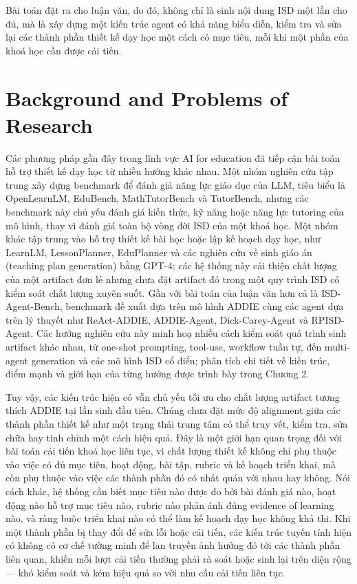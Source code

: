 \documentclass[../main.tex]{subfiles}
\begin{document}
Bài toán đặt ra cho luận văn, do đó, không chỉ là sinh nội dung ISD một lần cho đủ, mà là xây dựng một kiến trúc agent có khả năng biểu diễn, kiểm tra và sửa lại các thành phần thiết kế dạy học một cách có mục tiêu, mỗi khi một phần của khoá học cần được cải tiến.

\section{Background and Problems of Research}
\label{sec:giaiphap}

Các phương pháp gần đây trong lĩnh vực AI for education đã tiếp cận bài toán hỗ trợ thiết kế dạy học từ nhiều hướng khác nhau. Một nhóm nghiên cứu tập trung xây dựng benchmark để đánh giá năng lực giáo dục của LLM, tiêu biểu là OpenLearnLM, EduBench, MathTutorBench và TutorBench, nhưng các benchmark này chủ yếu đánh giá kiến thức, kỹ năng hoặc năng lực tutoring của mô hình, thay vì đánh giá toàn bộ vòng đời ISD của một khoá học. Một nhóm khác tập trung vào hỗ trợ thiết kế bài học hoặc lập kế hoạch dạy học, như LearnLM, LessonPlanner, EduPlanner và các nghiên cứu về sinh giáo án (teaching plan generation) bằng GPT-4; các hệ thống này cải thiện chất lượng của một artifact đơn lẻ nhưng chưa đặt artifact đó trong một quy trình ISD có kiểm soát chất lượng xuyên suốt. Gần với bài toán của luận văn hơn cả là ISD-Agent-Bench, benchmark đề xuất dựa trên mô hình ADDIE cùng các agent dựa trên lý thuyết như ReAct-ADDIE, ADDIE-Agent, Dick-Carey-Agent và RPISD-Agent. Các hướng nghiên cứu này minh hoạ nhiều cách kiểm soát quá trình sinh artifact khác nhau, từ one-shot prompting, tool-use, workflow tuần tự, đến multi-agent generation và các mô hình ISD cổ điển; phân tích chi tiết về kiến trúc, điểm mạnh và giới hạn của từng hướng được trình bày trong Chương 2.

Tuy vậy, các kiến trúc hiện có vẫn chủ yếu tối ưu cho chất lượng artifact tương thích ADDIE tại lần sinh đầu tiên. Chúng chưa đặt mức độ alignment giữa các thành phần thiết kế như một trạng thái trung tâm có thể truy vết, kiểm tra, sửa chữa hay tinh chỉnh một cách hiệu quả. Đây là một giới hạn quan trọng đối với bài toán cải tiến khoá học liên tục, vì chất lượng thiết kế không chỉ phụ thuộc vào việc có đủ mục tiêu, hoạt động, bài tập, rubric và kế hoạch triển khai, mà còn phụ thuộc vào việc các thành phần đó có nhất quán với nhau hay không. Nói cách khác, hệ thống cần biết mục tiêu nào được đo bởi bài đánh giá nào, hoạt động nào hỗ trợ mục tiêu nào, rubric nào phản ánh đúng evidence of learning nào, và ràng buộc triển khai nào có thể làm kế hoạch dạy học không khả thi. Khi một thành phần bị thay đổi để sửa lỗi hoặc cải tiến, các kiến trúc tuyến tính hiện có không có cơ chế tường minh để lan truyền ảnh hưởng đó tới các thành phần liên quan, khiến mỗi lượt cải tiến thường phải rà soát hoặc sinh lại trên diện rộng — khó kiểm soát và kém hiệu quả so với nhu cầu cải tiến liên tục.
\end{document}
